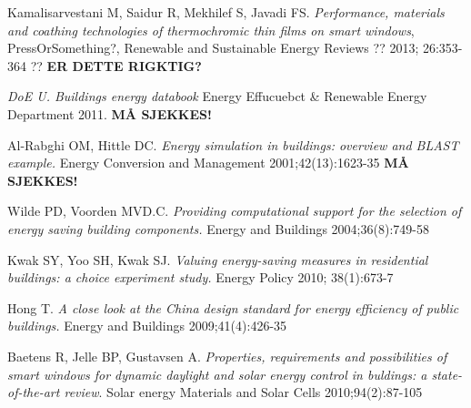 \cite{buildingsEnergyDatabook}
\begin{thebibliography}{9}


      Kamalisarvestani M, Saidur R, Mekhilef S, Javadi FS.
      \emph{Performance, materials and coathing technologies of thermochromic thin films on smart windows}, 
      PressOrSomething?, 
      Renewable and Sustainable Energy Reviews ??
      2013; 26:353-364 ??
      \textbf{ER DETTE RIGKTIG?}

      \emph{DoE U. Buildings energy databook}
      Energy Effucuebct \& Renewable Energy Department 2011.
      \textbf{MÅ SJEKKES!}

      Al-Rabghi OM, Hittle DC.  
      \emph{Energy simulation in buildings: overview and BLAST example.} 
      Energy Conversion and Management 
      2001;42(13):1623-35 
      \textbf{MÅ SJEKKES!}

      Wilde PD, Voorden MVD.C.  
      \emph{Providing computational support for the selection of energy saving building components.} 
      Energy and Buildings 
      2004;36(8):749-58

      Kwak SY, Yoo SH, Kwak SJ.
      \emph{Valuing energy-saving measures in residential buildings: a choice experiment study.}
      Energy Policy
      2010; 38(1):673-7

      Hong T. 
      \emph{A close look at the China design standard for energy efficiency of public buildings.}
      Energy and Buildings
      2009;41(4):426-35

      Baetens R, Jelle BP, Gustavsen A.
      \emph{Properties, requirements and possibilities of smart windows for dynamic daylight and solar energy control in buldings: a state-of-the-art review}.
      Solar energy Materials and Solar Cells
      2010;94(2):87-105

\end{thebibliography}
